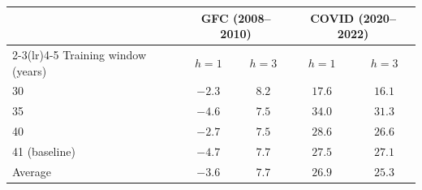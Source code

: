 \begin{tabular}{lcccc}
\toprule
 & \multicolumn{2}{c}{GFC (2008--2010)} & \multicolumn{2}{c}{COVID (2020--2022)} \\
\cmidrule(lr){2-3}\cmidrule(lr){4-5}
Training window (years) & $h=1$ & $h=3$ & $h=1$ & $h=3$ \\
\midrule
30 & $-2.3$ & $8.2$ & $17.6$ & $16.1$ \\
35 & $-4.6$ & $7.5$ & $34.0$ & $31.3$ \\
40 & $-2.7$ & $7.5$ & $28.6$ & $26.6$ \\
41 (baseline) & $-4.7$ & $7.7$ & $27.5$ & $27.1$ \\
\midrule
Average & $-3.6$ & $7.7$ & $26.9$ & $25.3$ \\
\bottomrule
\end{tabular}
